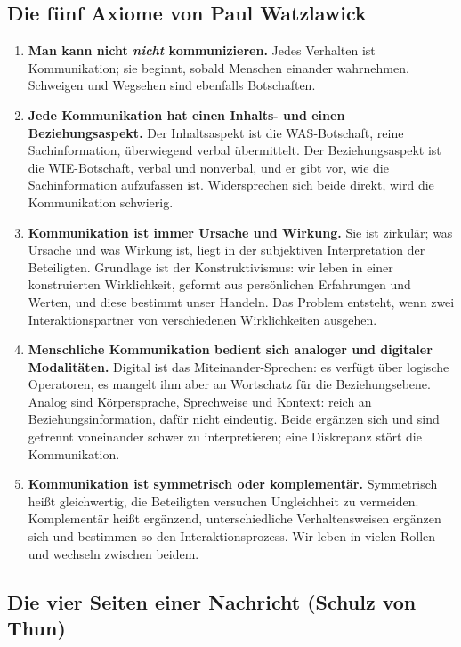 \documentclass[12pt, a4paper]{article}
\begin{document}
\subsection{Die fünf Axiome von Paul Watzlawick}

\begin{enumerate}
  \item \textbf{Man kann nicht \emph{nicht} kommunizieren.} Jedes Verhalten
        ist Kommunikation; sie beginnt, sobald Menschen einander wahrnehmen.
        Schweigen und Wegsehen sind ebenfalls Botschaften.
  \item \textbf{Jede Kommunikation hat einen Inhalts- und einen
        Beziehungsaspekt.} Der Inhaltsaspekt ist die WAS-Botschaft, reine
        Sachinformation, überwiegend verbal übermittelt. Der
        Beziehungsaspekt ist die WIE-Botschaft, verbal und nonverbal, und er
        gibt vor, wie die Sachinformation aufzufassen ist. Widersprechen
        sich beide direkt, wird die Kommunikation schwierig.
  \item \textbf{Kommunikation ist immer Ursache und Wirkung.} Sie ist
        zirkulär; was Ursache und was Wirkung ist, liegt in der subjektiven
        Interpretation der Beteiligten. Grundlage ist der Konstruktivismus:
        wir leben in einer konstruierten Wirklichkeit, geformt aus
        persönlichen Erfahrungen und Werten, und diese bestimmt unser
        Handeln. Das Problem entsteht, wenn zwei Interaktionspartner von
        verschiedenen Wirklichkeiten ausgehen.
  \item \textbf{Menschliche Kommunikation bedient sich analoger und digitaler
        Modalitäten.} Digital ist das Miteinander-Sprechen: es verfügt über
        logische Operatoren, es mangelt ihm aber an Wortschatz für die
        Beziehungsebene. Analog sind Körpersprache, Sprechweise und Kontext:
        reich an Beziehungsinformation, dafür nicht eindeutig. Beide
        ergänzen sich und sind getrennt voneinander schwer zu interpretieren;
        eine Diskrepanz stört die Kommunikation.
  \item \textbf{Kommunikation ist symmetrisch oder komplementär.}
        Symmetrisch heißt gleichwertig, die Beteiligten versuchen
        Ungleichheit zu vermeiden. Komplementär heißt ergänzend,
        unterschiedliche Verhaltensweisen ergänzen sich und bestimmen so den
        Interaktionsprozess. Wir leben in vielen Rollen und wechseln
        zwischen beidem.
\end{enumerate}

\subsection{Die vier Seiten einer Nachricht (Schulz von Thun)}
\end{document}
